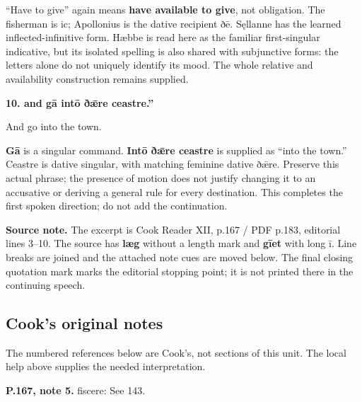 “Have to give” again means \textbf{have available to give}, not obligation. The fisherman is ic; Apollonius is the dative recipient ðē. Sęllanne has the learned inflected-infinitive form. Hæbbe is read here as the familiar first-singular indicative, but its isolated spelling is also shared with subjunctive forms: the letters alone do not uniquely identify its mood. The whole relative and availability construction remains supplied.

\textbf{10. and gā intō ðǣre ceastre.”}

And go into the town.

\textbf{Gā} is a singular command. \textbf{Intō ðǣre ceastre} is supplied as “into the town.” Ceastre is dative singular, with matching feminine dative ðǣre. Preserve this actual phrase; the presence of motion does not justify changing it to an accusative or deriving a general rule for every destination. This completes the first spoken direction; do not add the continuation.

\textbf{Source note.} The excerpt is Cook Reader XII, p.167 /\allowbreak{} PDF p.183, editorial lines 3–10. The source has \textbf{læg} without a length mark and \textbf{gīet} with long ī. Line breaks are joined and the attached note cues are moved below. The final closing quotation mark marks the editorial stopping point; it is not printed there in the continuing speech.

\subsection*{Cook’s original notes}

The numbered references below are Cook’s, not sections of this unit. The local help above supplies the needed interpretation.

\textbf{P.167, note 5.} fiscere: See 143.

